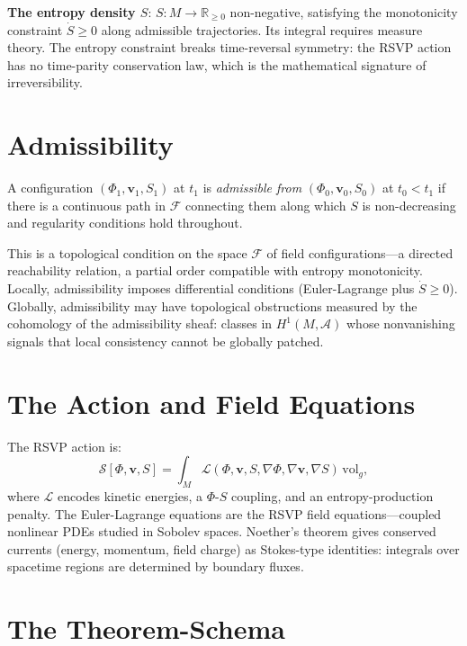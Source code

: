 \documentclass[12pt, twoside, openright, a4paper]{book}
\newcommand{\R}{\mathbb{R}}
\begin{document}
\textbf{The entropy density $S$}: $S: M \to \R_{\geq 0}$ non-negative, satisfying the monotonicity constraint $\dot S \geq 0$ along admissible trajectories.
Its integral requires measure theory.
The entropy constraint breaks time-reversal symmetry: the RSVP action has no time-parity conservation law, which is the mathematical signature of irreversibility.

\section{Admissibility}

A configuration $(\Phi_1,\mathbf{v}_1,S_1)$ at $t_1$ is \emph{admissible from} $(\Phi_0,\mathbf{v}_0,S_0)$ at $t_0 < t_1$ if there is a continuous path in $\mathcal{F}$ connecting them along which $S$ is non-decreasing and regularity conditions hold throughout.

This is a topological condition on the space $\mathcal{F}$ of field configurations---a directed reachability relation, a partial order compatible with entropy monotonicity.
Locally, admissibility imposes differential conditions (Euler-Lagrange plus $\dot S \geq 0$).
Globally, admissibility may have topological obstructions measured by the cohomology of the admissibility sheaf: classes in $H^1(M, \mathcal{A})$ whose nonvanishing signals that local consistency cannot be globally patched.

\section{The Action and Field Equations}

The RSVP action is:
\[\mathcal{S}[\Phi, \mathbf{v}, S] = \int_M \mathcal{L}(\Phi, \mathbf{v}, S, \nabla\Phi, \nabla\mathbf{v}, \nabla S)\,\mathrm{vol}_g,\]
where $\mathcal{L}$ encodes kinetic energies, a $\Phi$-$S$ coupling, and an entropy-production penalty.
The Euler-Lagrange equations are the RSVP field equations---coupled nonlinear PDEs studied in Sobolev spaces.
Noether's theorem gives conserved currents (energy, momentum, field charge) as Stokes-type identities: integrals over spacetime regions are determined by boundary fluxes.

\section{The Theorem-Schema}
\end{document}
